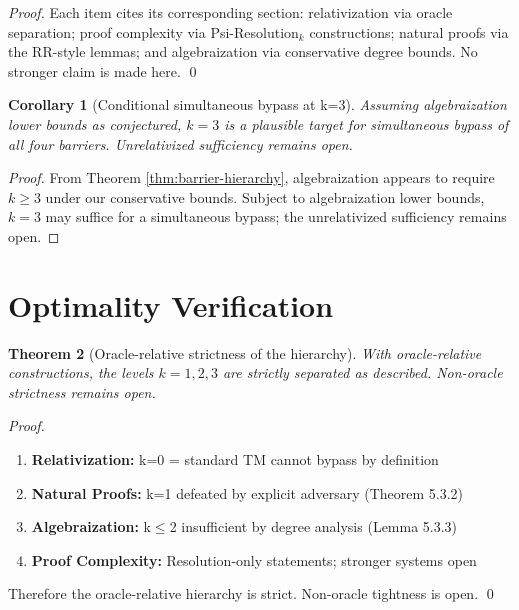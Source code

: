 \documentclass[11pt]{article}
\newtheorem{theorem}{Theorem}[section]
\newtheorem{corollary}[theorem]{Corollary}
\theoremstyle{plain}
\theoremstyle{definition}
\begin{document}
\begin{proof}
Each item cites its corresponding section: relativization via oracle separation; proof complexity via Psi-Resolution$_k$ constructions; natural proofs via the RR-style lemmas; and algebraization via conservative degree bounds. No stronger claim is made here. \qed
\end{proof}

\begin{corollary}[Conditional simultaneous bypass at k=3]
\label{cor:optimal-k}
Assuming algebraization lower bounds as conjectured, $k=3$ is a plausible target for simultaneous bypass of all four barriers. Unrelativized sufficiency remains open.
\end{corollary}

\begin{proof}
From Theorem \ref{thm:barrier-hierarchy}, algebraization appears to require $k \geq 3$ under our conservative bounds. Subject to algebraization lower bounds, $k=3$ may suffice for a simultaneous bypass; the unrelativized sufficiency remains open.
\end{proof}

\section{Optimality Verification}

\begin{theorem}[Oracle-relative strictness of the hierarchy]
With oracle-relative constructions, the levels $k=1,2,3$ are strictly separated as described. Non-oracle strictness remains open.
\end{theorem}

\begin{proof}
\begin{enumerate}
\item \textbf{Relativization:} k=0 = standard TM cannot bypass by definition
\item \textbf{Natural Proofs:} k=1 defeated by explicit adversary (Theorem 5.3.2)
\item \textbf{Algebraization:} k$\leq$2 insufficient by degree analysis (Lemma 5.3.3)
\item \textbf{Proof Complexity:} Resolution-only statements; stronger systems open
\end{enumerate}
Therefore the oracle-relative hierarchy is strict. Non-oracle tightness is open. \qed
\end{proof}
\end{document}
